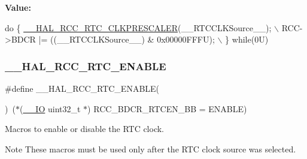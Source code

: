{\bfseries Value\+:}
\begin{DoxyCode}
\textcolor{keywordflow}{do} \{ \hyperlink{group___r_c_c___internal___r_t_c___clock___configuration_ga7e10e306e7d9f3cd59d30dcb2c9cf61d}{\_\_HAL\_RCC\_RTC\_CLKPRESCALER}(\_\_RTCCLKSource\_\_);    \(\backslash\)
                                                    RCC->BDCR |= ((\_\_RTCCLKSource\_\_) & 0x00000FFFU);  \(\backslash\)
                                                   \} \textcolor{keywordflow}{while}(0U)
\end{DoxyCode}
\mbox{\label{group___r_c_c___internal___r_t_c___clock___configuration_gab7cc36427c31da645a0e38e181f8ce0f}} 
\subsubsection{\texorpdfstring{\+\_\+\+\_\+\+H\+A\+L\+\_\+\+R\+C\+C\+\_\+\+R\+T\+C\+\_\+\+E\+N\+A\+B\+LE}{\_\_HAL\_RCC\_RTC\_ENABLE}}
{\footnotesize\ttfamily \#define \+\_\+\+\_\+\+H\+A\+L\+\_\+\+R\+C\+C\+\_\+\+R\+T\+C\+\_\+\+E\+N\+A\+B\+LE(\begin{DoxyParamCaption}{ }\end{DoxyParamCaption})~($\ast$(\hyperlink{core__sc300_8h_aec43007d9998a0a0e01faede4133d6be}{\+\_\+\+\_\+\+IO} uint32\+\_\+t $\ast$) R\+C\+C\+\_\+\+B\+D\+C\+R\+\_\+\+R\+T\+C\+E\+N\+\_\+\+BB = E\+N\+A\+B\+LE)}



Macros to enable or disable the R\+TC clock. 

\begin{DoxyNote}{Note}
These macros must be used only after the R\+TC clock source was selected. 
\end{DoxyNote}
